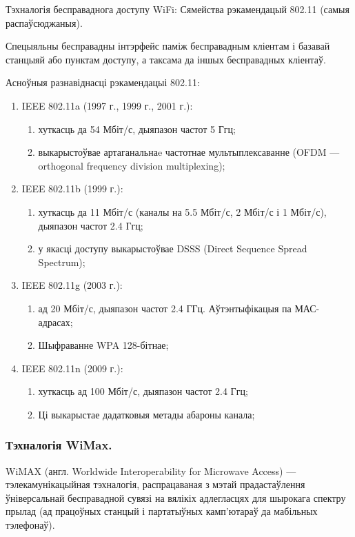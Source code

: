 Тэхналогія бесправаднога доступу WiFi: Сямейства рэкамендацый 802.11 (самыя распаўсюджаныя).

Спецыяльны бесправадны інтэрфейс паміж бесправадным кліентам і базавай станцыяй або пунктам доступу, а таксама да іншых бесправадных кліентаў.

Асноўныя разнавіднасці рэкамендацыі 802.11:
\begin{enumerate}
    \item IEEE 802.11a (1997 г., 1999 г., 2001 г.):
    \begin{enumerate}
        \item хуткасць да 54 Мбіт/с, дыяпазон частот 5 Ггц;
        \item выкарыстоўвае  артаганальнаe частотнае мультыплексаванне (OFDM --- or\-tho\-go\-nal frequency division multiplexing);
    \end{enumerate}
    \item IEEE 802.11b (1999 г.):
    \begin{enumerate}
        \item хуткасць да 11 Мбіт/с (каналы на 5.5 Мбіт/с, 2 Мбіт/с і 1 Мбіт/с), дыяпазон частот 2.4 Ггц;
        \item у якасці доступу выкарыстоўвае DSSS (Direct Sequence Spread Spectrum);
    \end{enumerate}
    \item IEEE 802.11g (2003 г.):
    \begin{enumerate}
        \item ад 20 Мбіт/с, дыяпазон частот 2.4 ГГц. Аўтэнтыфікацыя па МАС-адрасах;
        \item Шыфраванне WPA 128-бітнае;
    \end{enumerate}
    \item IEEE 802.11n (2009 г.):
    \begin{enumerate}
        \item хуткасць ад 100 Мбіт/с, дыяпазон частот 2.4 Ггц;
        \item Ці выкарыстае дадатковыя метады абароны канала;
    \end{enumerate}
\end{enumerate}

\subsubsection{Тэхналогія WiMax.}

WiMAX (англ. Worldwide Interoperability for Microwave Access) --- тэлекамунікацыйная тэхналогія, распрацаваная з мэтай прадастаўлення ўніверсальнай бесправадной сувязі на вялікіх адлегласцях для шырокага спектру прылад (ад працоўных станцый і партатыўных камп'ютараў да мабільных тэлефонаў).

